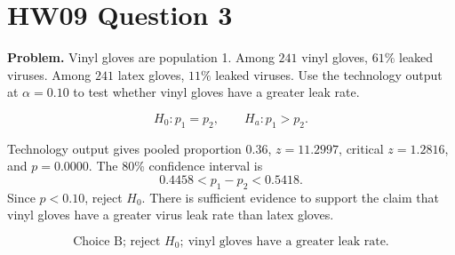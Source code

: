 \documentclass[11pt]{article}
\begin{document}
\section*{HW09 Question 3}

\textbf{Problem.} Vinyl gloves are population 1. Among \(241\) vinyl gloves, \(61\%\) leaked viruses. Among \(241\) latex gloves, \(11\%\) leaked viruses. Use the technology output at \(\alpha=0.10\) to test whether vinyl gloves have a greater leak rate.

\[
H_0:p_1=p_2,\qquad H_a:p_1>p_2.
\]

Technology output gives pooled proportion \(0.36\), \(z=11.2997\), critical \(z=1.2816\), and \(p=0.0000\). The 80\% confidence interval is
\[
0.4458 < p_1-p_2 < 0.5418.
\]
Since \(p<0.10\), reject \(H_0\). There is sufficient evidence to support the claim that vinyl gloves have a greater virus leak rate than latex gloves.

\[
\boxed{\text{Choice B; reject }H_0;\ \text{vinyl gloves have a greater leak rate.}}
\]
\end{document}
